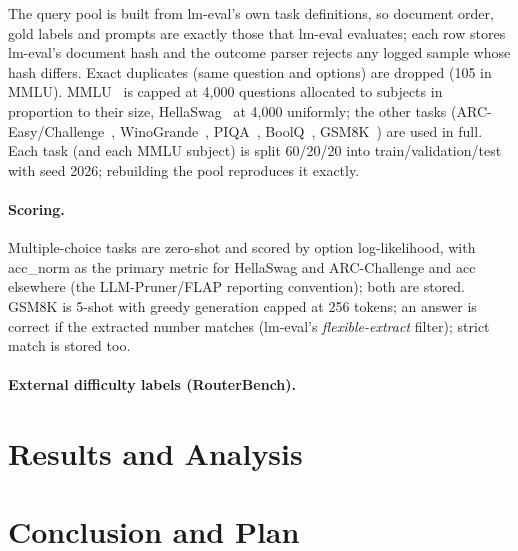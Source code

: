 \documentclass[11pt,a4paper]{article}
\begin{document}
The query pool is built from lm-eval's own task definitions, so document order, gold labels and prompts
are exactly those that lm-eval evaluates; each row stores lm-eval's document hash and the outcome
parser rejects any logged sample whose hash differs. Exact duplicates (same question and options) are
dropped (105 in MMLU). MMLU~\citep{hendrycks2021mmlu} is capped at 4{,}000 questions allocated to subjects
in proportion to their size, HellaSwag~\citep{zellers2019hellaswag} at 4{,}000 uniformly; the other tasks
(ARC-Easy/Challenge~\citep{clark2018arc}, WinoGrande~\citep{sakaguchi2019winogrande}, PIQA~\citep{bisk2020piqa},
BoolQ~\citep{clark2019boolq}, GSM8K~\citep{cobbe2021gsm8k}) are used in full. Each task (and each MMLU subject)
is split 60/20/20 into train/validation/test with seed 2026; rebuilding the pool reproduces it exactly.

\paragraph{Scoring.} Multiple-choice tasks are zero-shot and scored by option log-likelihood, with
acc\_norm as the primary metric for HellaSwag and ARC-Challenge and acc elsewhere (the LLM-Pruner/FLAP
reporting convention); both are stored. GSM8K is 5-shot with greedy generation capped at 256 tokens;
an answer is correct if the extracted number matches (lm-eval's \emph{flexible-extract} filter); strict
match is stored too.

\paragraph{External difficulty labels (RouterBench).}


\section{Results and Analysis}
\label{sec:results}


\section{Conclusion and Plan}
\label{sec:plan}

\end{document}
